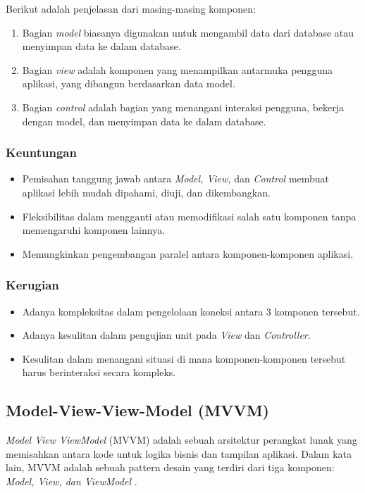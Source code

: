 \documentclass[conference]{IEEEtran}
\begin{document}
Berikut adalah penjelasan dari masing-masing komponen:
\begin{enumerate}[label=\alph*]
\item Bagian \textit{model} biasanya digunakan untuk mengambil data dari database atau menyimpan data ke dalam database. 
\item Bagian \textit{view} adalah komponen yang menampilkan antarmuka pengguna aplikasi, yang dibangun berdasarkan data model. 
\item Bagian \textit{control} adalah bagian yang menangani interaksi pengguna, bekerja dengan model, dan menyimpan data ke dalam database.
\end{enumerate}

\subsubsection{Keuntungan}
\begin{itemize}
	\item Pemisahan tanggung jawab antara \textit{Model, View,} dan \textit{Control} membuat aplikasi lebih mudah dipahami, diuji, dan dikembangkan.
	\item Fleksibilitas dalam mengganti atau memodifikasi salah satu komponen tanpa memengaruhi komponen lainnya.
        \item Memungkinkan pengembangan paralel antara komponen-komponen aplikasi.
\end{itemize}
\subsubsection{Kerugian}
\begin{itemize}
	\item Adanya kompleksitas dalam pengelolaan koneksi antara 3 komponen tersebut.
        \item Adanya kesulitan dalam pengujian unit pada \textit{View} dan \textit{Controller}.
        \item Kesulitan dalam menangani situasi di mana komponen-komponen tersebut harus berinteraksi secara kompleks.
\end{itemize}

\subsection{Model-View-View-Model (MVVM)}
\textit{Model View ViewModel} (MVVM) adalah sebuah arsitektur perangkat lunak yang memisahkan antara kode untuk logika bisnis dan tampilan aplikasi\cite{MVVM}. Dalam kata lain, MVVM adalah sebuah pattern desain yang terdiri dari tiga komponen: \textit{Model, View, dan ViewModel} \cite{MVVM2}.  
\end{document}
